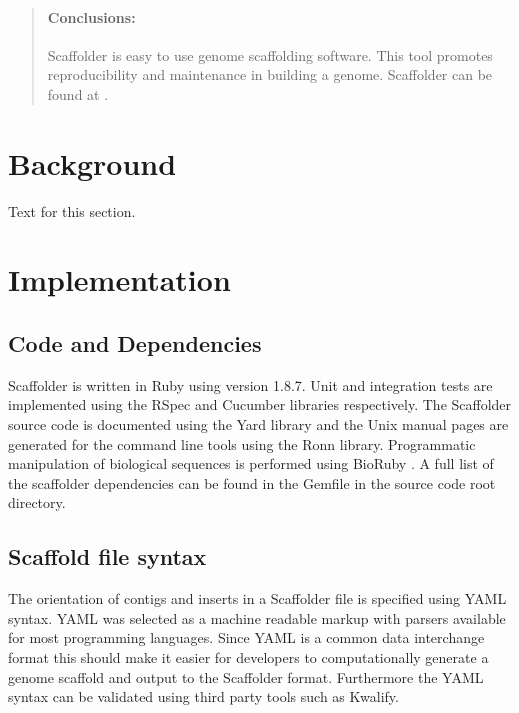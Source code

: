 \documentclass[10pt]{bmc_article}
\newenvironment{bmcformat}{\begin{raggedright}\baselineskip20pt\sloppy\setboolean{publ}{false}}{\end{raggedright}\baselineskip20pt\sloppy}
\begin{document}
\begin{bmcformat}
\begin{abstract}
  \paragraph*{Conclusions:} Scaffolder is easy to use genome scaffolding
  software. This tool promotes reproducibility and maintenance in building
  a genome. Scaffolder can be found at \scaffolder.

\end{abstract}


\section*{Background}
 Text for this section.
\section*{Implementation} %

\subsection*{Code and Dependencies} %

Scaffolder is written in Ruby \cite{ruby-lang} using version 1.8.7. Unit and
integration tests are implemented using the RSpec and Cucumber libraries
respectively\cite{rspec}. The Scaffolder source code is documented using the
Yard\cite{yard} library and the Unix manual pages are generated for the command
line tools using the Ronn library\cite{ronn}. Programmatic manipulation of
biological sequences is performed using BioRuby \cite{bioruby}. A full list of
the scaffolder dependencies can be found in the Gemfile in the source code root
directory.\pb

\subsection*{Scaffold file syntax} %

The orientation of contigs and inserts in a Scaffolder file is specified using
YAML syntax\cite{yaml}. YAML was selected as a machine readable markup with
parsers available for most programming languages. Since YAML is a common data
interchange format this should make it easier for developers to computationally
generate a genome scaffold and output to the Scaffolder format. Furthermore the
YAML syntax can be validated using third party tools such as
Kwalify\cite{kwalify}.\pb


\end{bmcformat}
\end{document}
